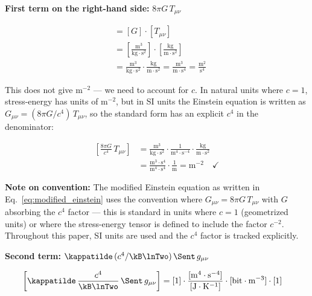 \vspace{0.5em}
\noindent\textbf{First term on the right-hand side:} $8\pi G\,T_{\mu\nu}$

\begin{align}
    [8\pi G\,T_{\mu\nu}]
    &= [G]\cdot[T_{\mu\nu}] \nonumber \\
    &= \left[\frac{\mathrm{m}^3}{\mathrm{kg}\cdot\mathrm{s}^2}\right]
    \cdot\left[\frac{\mathrm{kg}}{\mathrm{m}\cdot\mathrm{s}^2}\right]
    \nonumber \\
    &= \frac{\mathrm{m}^3}{\mathrm{kg}\cdot\mathrm{s}^2}
    \cdot\frac{\mathrm{kg}}{\mathrm{m}\cdot\mathrm{s}^2}
    = \frac{\mathrm{m}^3}{\mathrm{m}\cdot\mathrm{s}^4}
    = \frac{\mathrm{m}^2}{\mathrm{s}^4}
    \label{eq:dim_first_term_wrong}
\end{align}

This does not give m$^{-2}$ --- we need to account for $c$. In natural
units where $c=1$, stress-energy has units of m$^{-2}$, but in SI units
the Einstein equation is written as $G_{\mu\nu} = (8\pi G/c^4)\,T_{\mu\nu}$,
so the standard form has an explicit $c^4$ in the denominator:

\begin{align}
    \left[\frac{8\pi G}{c^4}\,T_{\mu\nu}\right]
    &= \frac{\mathrm{m}^3}{\mathrm{kg}\cdot\mathrm{s}^2}
    \cdot\frac{1}{\mathrm{m}^4\cdot\mathrm{s}^{-4}}
    \cdot\frac{\mathrm{kg}}{\mathrm{m}\cdot\mathrm{s}^2}
    \nonumber \\
    &= \frac{\mathrm{m}^3\cdot\mathrm{s}^4}{\mathrm{m}^4\cdot\mathrm{s}^4}
    \cdot\frac{1}{\mathrm{m}}
    = \mathrm{m}^{-2} \quad \checkmark
    \label{eq:dim_first_term_correct}
\end{align}

\noindent\textbf{Note on convention:} The modified Einstein equation
as written in Eq.~\eqref{eq:modified_einstein} uses the convention
where $G_{\mu\nu} = 8\pi G\,T_{\mu\nu}$ with $G$ absorbing the $c^4$
factor --- this is standard in units where $c = 1$ (geometrized units)
or where the stress-energy tensor is defined to include the factor
$c^{-2}$. Throughout this paper, SI units are used and the $c^4$
factor is tracked explicitly.

\vspace{0.5em}
\noindent\textbf{Second term:}
$\kappatilde\,(c^4/\kB\lnTwo)\,\Sent\,g_{\mu\nu}$

\begin{align}
    \left[\kappatilde\,\frac{c^4}{\kB\lnTwo}\,\Sent\,g_{\mu\nu}\right]
    &= [1]\cdot\frac{[\mathrm{m}^4\cdot\mathrm{s}^{-4}]}
    {[\mathrm{J}\cdot\mathrm{K}^{-1}]}\cdot
    [\mathrm{bit}\cdot\mathrm{m}^{-3}]\cdot[1]
    \label{eq:dim_second_term_start}
\end{align}

